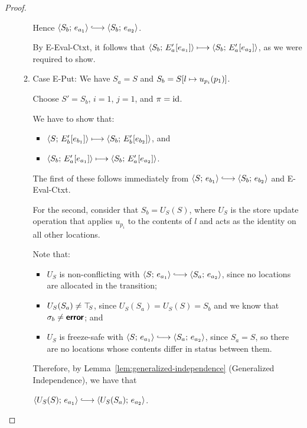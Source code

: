\begin{proof}
\begin{enumerate}
\begin{enumerate}
      Hence $\config{S_b}{e_{a_1}} \parstepsto \config{S_b}{e_{a_2}}$.

      By {\sc E-Eval-Ctxt}, it follows that
      $\langle S_b;\, E'_a\hspace{-0.5mm}\left[e_{a_1}\right] \rangle \longmapsto
      \langle S_b;\, E'_a\hspace{-0.5mm}\left[e_{a_2}\right] \rangle$,
      as we were required to show.

    \item \label{slqc-beta-put}Case {\sc E-Put}: We have $S_a = S$ and
      $S_b = S[l \mapsto u_{p_i}(p_1)]$.

      Choose $S' = S_b$, $i = 1$, $j = 1$, and $\pi = \mathrm{id}$.

      We have to show that:
      \begin{itemize}
      \item $\langle S;\, E'_b\hspace{-0.5mm}\left[e_{b_1}\right] \rangle \longmapsto
        \langle S_b;\, E'_b\hspace{-0.5mm}\left[e_{b_2}\right] \rangle$, and
      \item $\langle S_b;\, E'_a\hspace{-0.5mm}\left[e_{a_1}\right] \rangle \longmapsto
        \langle S_b;\, E'_a\hspace{-0.5mm}\left[e_{a_2}\right] \rangle$.
      \end{itemize}

      The first of these follows immediately from $\config{S}{e_{b_1}}
      \parstepsto \config{S_b}{e_{b_2}}$ and {\sc E-Eval-Ctxt}.

      For the second, consider that $S_b = U_S(S)$, where $U_S$ is the
      store update operation that applies $u_{p_i}$ to the contents of
      $l$ and acts as the identity on all other locations.

      Note that:
      \begin{itemize}
      \item $U_S$ is non-conflicting with $\config{S}{e_{a_1}}
        \parstepsto \config{S_a}{e_{a_2}}$, since no locations are
        allocated in the transition;
      \item $U_S(S_a) \neq \top\hspace{-0.85mm}_{S}$, since $U_S(S_a) = U_S(S) = S_b$
        and we know that $\sigma_b \neq \textbf{\textsf{error}}$; and
      \item $U_S$ is freeze-safe with $\config{S}{e_{a_1}}
        \parstepsto \config{S_a}{e_{a_2}}$, since $S_a = S$, so
        there are no locations whose contents differ in status
        between them.
      \end{itemize}

      Therefore, by Lemma~\ref{lem:generalized-independence}
      (Generalized Independence), we have that

      $\config{U_S(S)}{e_{a_1}} \parstepsto
      \config{U_S(S_a)}{e_{a_2}}$.


\end{enumerate}
\end{enumerate}
\end{proof}
